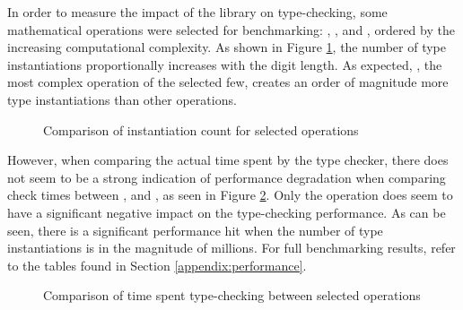 In order to measure the impact of the library on type-checking, some mathematical operations were selected for benchmarking: , ,  and , ordered by the increasing computational complexity. As shown in Figure \ref{fig:instantiation-count}, the number of type instantiations proportionally increases with the digit length. As expected, , the most complex operation of the selected few, creates an order of magnitude more type instantiations than other operations.

\pagebreak

\begin{figure}[ht]
  \centering
  \resizebox{\textwidth}{!}{}
  \caption{Comparison of instantiation count for selected operations}
  \label{fig:instantiation-count}
\end{figure}

However, when comparing the actual time spent by the type checker, there does not seem to be a strong indication of performance degradation when comparing check times between ,  and , as seen in Figure \ref{fig:check-time}. Only the  operation does seem to have a significant negative impact on the type-checking performance. As can be seen, there is a significant performance hit when the number of type instantiations is in the magnitude of millions. For full benchmarking results, refer to the tables found in Section \ref{appendix:performance}.

\begin{figure}[ht]
  \centering
  \resizebox{\textwidth}{!}{}
  \caption{Comparison of time spent type-checking between selected operations}
  \label{fig:check-time}
\end{figure}

